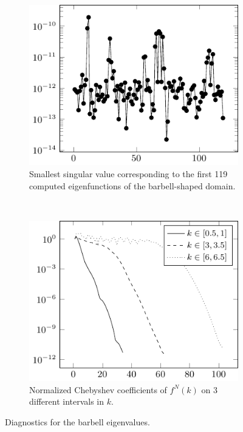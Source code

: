 \begin{figure}
  \centering
  \begin{subfigure}[t]{0.4\textwidth}
    \centering
    \includegraphics[width=\textwidth]{fig/ex_barbell_001_sings_plot}
    \caption{Smallest singular value corresponding to the
    first 119 computed eigenfunctions of the barbell-shaped
    domain.}
    \label{subfig:barbell_sings}
  \end{subfigure}
  ~
  \begin{subfigure}[t]{0.4\textwidth}
    \centering
    \includegraphics[width=\textwidth]{fig/ex_barbell_001_coeffs_plot}
    \caption{Normalized Chebyshev coefficients of $f^N(k)$ on
      3 different intervals in $k$.}
    \label{subfig:barbell_coeffs}
  \end{subfigure}
  \caption{Diagnostics for the barbell eigenvalues.}
  \label{fig:barbell_diagnostics}
\end{figure}

